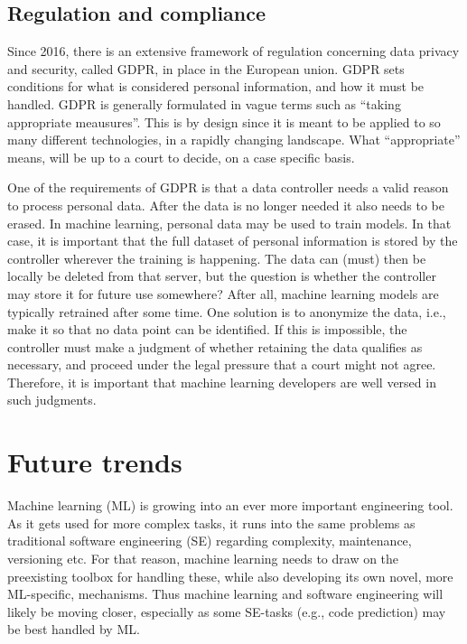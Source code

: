 \documentclass{article}
\begin{document}
\subsection{Regulation and compliance}

Since 2016, there is an extensive framework of regulation concerning data privacy and security, called GDPR, in place in the European union.
GDPR sets conditions for what is considered personal information, and how it must be handled.
GDPR is generally formulated in vague terms such as ``taking appropriate meausures''.
This is by design since it is meant to be applied to so many different technologies, in a rapidly changing landscape.
What ``appropriate'' means, will be up to a court to decide, on a case specific basis.

One of the requirements of GDPR is that a data controller needs a valid reason to process personal data.
After the data is no longer needed it also needs to be erased.
In machine learning, personal data may be used to train models.
In that case, it is important that the full dataset of personal information is stored by the controller wherever the training is happening.
The data can (must) then be locally be deleted from that server, but the question is whether the controller may store it for future use somewhere?
After all, machine learning models are typically retrained after some time.
One solution is to anonymize the data, i.e., make it so that no data point can be identified.
If this is impossible, the controller must make a judgment of whether retaining the data qualifies as necessary, and proceed under the legal pressure that a court might not agree.
Therefore, it is important that machine learning developers are well versed in such judgments.

\section{Future trends}

Machine learning (ML) is growing into an ever more important engineering tool.
As it gets used for more complex tasks, it runs into the same problems as traditional software engineering (SE) regarding complexity, maintenance, versioning etc.
For that reason, machine learning needs to draw on the preexisting toolbox for handling these, while also developing its own novel, more ML-specific, mechanisms.
Thus machine learning and software engineering will likely be moving closer, especially as some SE-tasks (e.g., code prediction) may be best handled by ML. 
\end{document}
